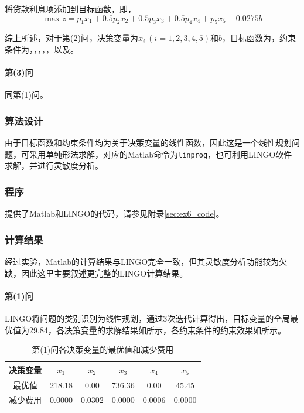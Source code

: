 \documentclass[12pt,a4paper]{article}
\begin{document}
将贷款利息项添加到目标函数，即，
\begin{equation}\label{eq:ex6_profit2}
    \max z = p_1 x_1 + 0.5 p_2 x_2 + 0.5 p_3 x_3 + 0.5 p_4 x_4 + p_5 x_5 - 0.0275 b
\end{equation}

综上所述，对于第(2)问，决策变量为$x_i\ (i=1,2,3,4,5)$和$b$，目标函数为，约束条件为，，，，，以及。

\paragraph{第(3)问} 同第(1)问。

\subsubsection{算法设计}

由于目标函数和约束条件均为关于决策变量的线性函数，因此这是一个线性规划问题，可采用单纯形法求解，对应的Matlab命令为\texttt{linprog}，也可利用LINGO软件求解，并进行灵敏度分析。

\subsubsection{程序}

提供了Matlab和LINGO的代码，请参见附录\ref{sec:ex6_code}。

\subsubsection{计算结果}

经过实验，Matlab的计算结果与LINGO完全一致，但其灵敏度分析功能较为欠缺，因此这里主要叙述更完整的LINGO计算结果。

\paragraph{第(1)问} LINGO将问题的类别识别为线性规划，通过3次迭代计算得出，目标变量的全局最优值为29.84，各决策变量的求解结果如所示，各约束条件的约束效果如所示。

\begin{table}[H]
    \centering
    \caption{第(1)问各决策变量的最优值和减少费用}
    \label{tab:ex6_1_result}
    \begin{tabular}{c|ccccc}
        \toprule
        决策变量 & \(x_1\) & \(x_2\) & \(x_3\) & \(x_4\) &
        \(x_5\)\tabularnewline
        \midrule
        最优值 & 218.18 & 0.00 & 736.36 & 0.00 & 45.45\tabularnewline
        减少费用 & 0.0000 & 0.0302 & 0.0000 & 0.0006 & 0.0000\tabularnewline
        \bottomrule
    \end{tabular}
\end{table}
\end{document}

